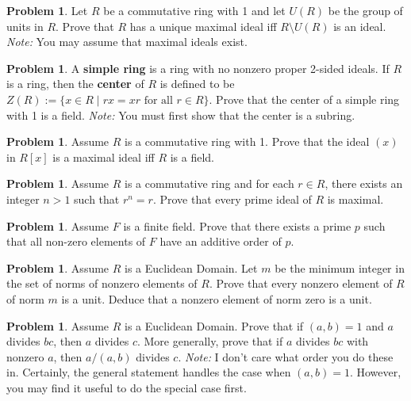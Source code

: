 \documentclass[11pt]{scrartcl}
\theoremstyle{definition}
\newtheorem{problem}[theorem]{Problem}
\begin{document}
\begin{problem}
Let $R$ be a commutative ring with 1 and let $U(R)$ be the group of units in $R$.  Prove that $R$ has a unique maximal ideal iff $R\setminus U(R)$ is an ideal.  \emph{Note:} You may assume that maximal ideals exist.
\end{problem}

\begin{problem}
A \textbf{simple ring} is a ring with no nonzero proper 2-sided ideals.  If $R$ is a ring, then the \textbf{center} of $R$ is defined to be $Z(R):=\{x\in R\mid rx=xr\text{ for all } r\in R\}$.  Prove that the center of a simple ring with 1 is a field.  \emph{Note:} You must first show that the center is a subring.
\end{problem}

\begin{problem}
Assume $R$ is a commutative ring with 1. Prove that the ideal $(x)$ in $R[x]$ is a maximal ideal iff $R$ is a field.
\end{problem}

\begin{problem}
Assume $R$ is a commutative ring and for each $r\in R$, there exists an integer $n>1$ such that $r^n=r$. Prove that every prime ideal of $R$ is maximal.
\end{problem}

\begin{problem}
Assume $F$ is a finite field. Prove that there exists a prime $p$ such that all non-zero elements of $F$ have an additive order of $p$.
\end{problem}

\begin{problem}
Assume $R$ is a Euclidean Domain.  Let $m$ be the minimum integer in the set of norms of nonzero elements of $R$. Prove that every nonzero element of $R$ of norm $m$ is a unit.  Deduce that a nonzero element of norm zero is a unit.
\end{problem}

\begin{problem}
Assume $R$ is a Euclidean Domain.  Prove that if $(a,b)=1$ and $a$ divides $bc$, then $a$ divides $c$. More generally, prove that if $a$ divides $bc$ with nonzero $a$, then $a/(a,b)$ divides $c$. \emph{Note:} I don't care what order you do these in.  Certainly, the general statement handles the case when $(a,b)=1$. However, you may find it useful to do the special case first.
\end{problem}
\end{document}
